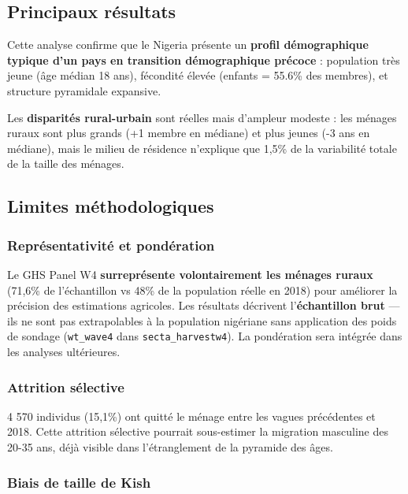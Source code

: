 \documentclass[
  10pt,
]{article}
\begin{document}
\subsection{Principaux résultats}\label{principaux-ruxe9sultats-1}

Cette analyse confirme que le Nigeria présente un \textbf{profil
démographique typique d'un pays en transition démographique précoce} :
population très jeune (âge médian 18 ans), fécondité élevée (enfants =
55.6\% des membres), et structure pyramidale expansive.

Les \textbf{disparités rural-urbain} sont réelles mais d'ampleur modeste
: les ménages ruraux sont plus grands (+1 membre en médiane) et plus
jeunes (-3 ans en médiane), mais le milieu de résidence n'explique que
1,5\% de la variabilité totale de la taille des ménages.

\subsection{Limites méthodologiques}\label{limites-muxe9thodologiques}

\subsubsection{Représentativité et
pondération}\label{repruxe9sentativituxe9-et-ponduxe9ration}

Le GHS Panel W4 \textbf{surreprésente volontairement les ménages ruraux}
(71,6\% de l'échantillon vs 48\% de la population réelle en 2018) pour
améliorer la précision des estimations agricoles. Les résultats
décrivent l'\textbf{échantillon brut} --- ils ne sont pas extrapolables
à la population nigériane sans application des poids de sondage
(\texttt{wt\_wave4} dans \texttt{secta\_harvestw4}). La pondération sera
intégrée dans les analyses ultérieures.

\subsubsection{Attrition sélective}\label{attrition-suxe9lective}

4 570 individus (15,1\%) ont quitté le ménage entre les vagues
précédentes et 2018. Cette attrition sélective pourrait sous-estimer la
migration masculine des 20-35 ans, déjà visible dans l'étranglement de
la pyramide des âges.

\subsubsection{Biais de taille de Kish}\label{biais-de-taille-de-kish}
\end{document}
